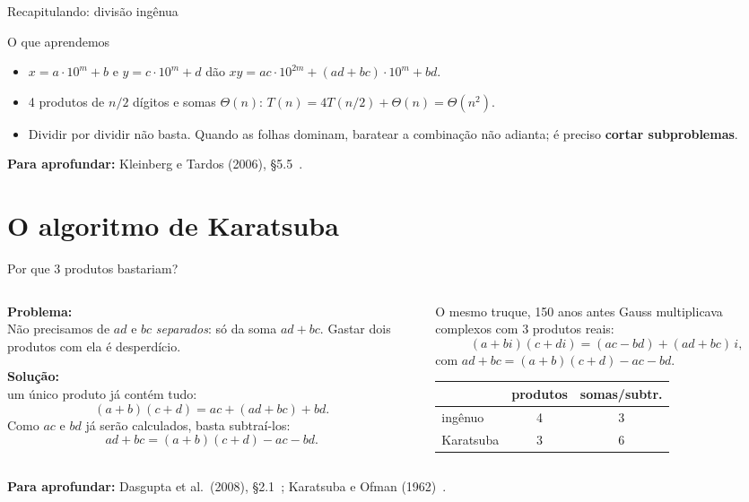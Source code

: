 \documentclass[aspectratio=169,xcolor=table]{beamer}
\newcommand{\fonte}[1]{%
  \vfill
  {\tiny\color{gray!55!black}\textbf{Para aprofundar:} #1\par}%
}
\begin{document}
\begin{frame}{Recapitulando: divisão ingênua}
  \begin{block}{O que aprendemos}
    \begin{itemize}\scriptsize
      \item $x=a\cdot10^m+b$ e $y=c\cdot10^m+d$ dão $xy=ac\cdot10^{2m}+(ad+bc)\cdot10^m+bd$.
      \item 4 produtos de $n/2$ dígitos e somas $\Theta(n)$:
            $T(n)=4T(n/2)+\Theta(n)=\Theta(n^2)$.
      \item Dividir por dividir não basta. Quando as folhas dominam, baratear a combinação
            não adianta; é preciso \textbf{cortar subproblemas}.
    \end{itemize}
  \end{block}
  \fonte{Kleinberg e Tardos (2006), \S 5.5~\cite{kleinberg2006algorithm}.}
\end{frame}

\section{O algoritmo de Karatsuba}

\begin{frame}{Por que 3 produtos bastariam?}
  \begin{columns}[T]
    \begin{column}{0.5\textwidth}
      \textbf{Problema:}\\
      \scriptsize Não precisamos de $ad$ e $bc$ \emph{separados}: só da soma $ad+bc$.
      Gastar dois produtos com ela é desperdício.
      \medskip

      \textbf{Solução:}\\
      \scriptsize um único produto já contém tudo:
      \[ (a+b)(c+d) = ac + (ad+bc) + bd. \]
      Como $ac$ e $bd$ já serão calculados, basta subtraí-los:
      \[ ad+bc = (a+b)(c+d) - ac - bd. \]
    \end{column}
    \begin{column}{0.46\textwidth}
      \begin{exampleblock}{O mesmo truque, 150 anos antes}
        \scriptsize Gauss multiplicava complexos com 3 produtos reais:
        \[ (a+bi)(c+di) = (ac-bd) + (ad+bc)\,i, \]
        com $ad+bc=(a+b)(c+d)-ac-bd$.
      \end{exampleblock}
      \scriptsize\centering
      \begin{tabular}{lcc}
        \toprule
                  & produtos & somas/subtr. \\
        \midrule
        ingênuo   & 4 & 3 \\
        \rowcolor{orange!15}
        Karatsuba & 3 & 6 \\
        \bottomrule
      \end{tabular}
    \end{column}
  \end{columns}
  \fonte{Dasgupta et al.\ (2008), \S 2.1~\cite{dasgupta2008algorithms};
    Karatsuba e Ofman (1962)~\cite{karatsuba1963multiplication}.}
\end{frame}
\end{document}
